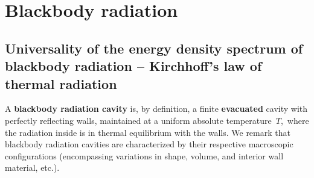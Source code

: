 

\chapter{Blackbody radiation}
\setcounter{theorem}{0}
\setcounter{equation}{0}


\renewcommand{\theenumi}{\roman{enumi}}
\renewcommand{\labelenumi}{\textnormal{(\theenumi)}$\;\;$}


\section{Universality of the energy density spectrum of blackbody radiation -- Kirchhoff's law of thermal radiation}


\vskip 0.5cm
\begin{definition}
\mbox{}
\vskip 0.1cm
\noindent
A \textbf{blackbody radiation cavity} is, by definition,
a finite \textbf{\color{red}evacuated} cavity
with perfectly reflecting walls, maintained
at a uniform absolute temperature \,$T$,\,
where the radiation inside is in thermal equilibrium with the walls.
We remark that blackbody radiation cavities are
characterized by their respective macroscopic configurations
(encompassing variations in shape, volume, and interior wall material, etc.).
\end{definition}

